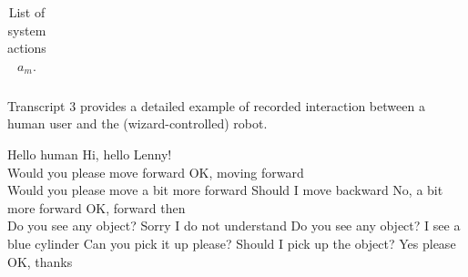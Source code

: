 \begin{table}[p]
\begin{footnotesize}
\begin{tabular}{p{60mm}}
\end{tabular}
\end{footnotesize}
 \caption{List of system actions $a_m$.} 
\label{table:systemdas_exp2}
\end{table}

Transcript 3 provides a detailed example of recorded interaction between a human user and the (wizard-controlled) robot.

\begin{Transcript}[p]
\begin{dialogue} \vspace{3mm}
 Hello human\vspace{2mm}
 Hi, hello Lenny! \vspace{1mm} \\ 
 \vspace{2mm}
 Would you please move forward\vspace{2mm}
 OK, moving forward  \vspace{1mm} \\
 \vspace{2mm}
 Would you please move a bit more forward\vspace{2mm}
 Should I move backward \vspace{2mm}
 No, a bit more forward\vspace{2mm}
 OK, forward then \vspace{1mm} \\ 
 \vspace{2mm}
 Do you see any object?\vspace{2mm}
 Sorry I do not understand\vspace{2mm}
 Do you see any object?\vspace{2mm}
 I see a blue cylinder\vspace{2mm}
 Can you pick it up please?\vspace{2mm}
 Should I pick up the object?\vspace{2mm}
 Yes please\vspace{2mm}
 OK, thanks  \vspace{1mm} \\
 \\
 \vspace{2mm}

\end{dialogue}
\end{Transcript}
